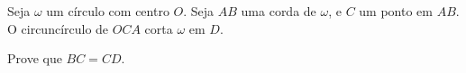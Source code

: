 Seja $\omega$ um círculo com centro $O$. Seja $AB$ uma corda de $\omega$, e $C$ um ponto em $AB$. O circuncírculo de $OCA$ corta $\omega$ em $D$.

Prove que $BC=CD$.
